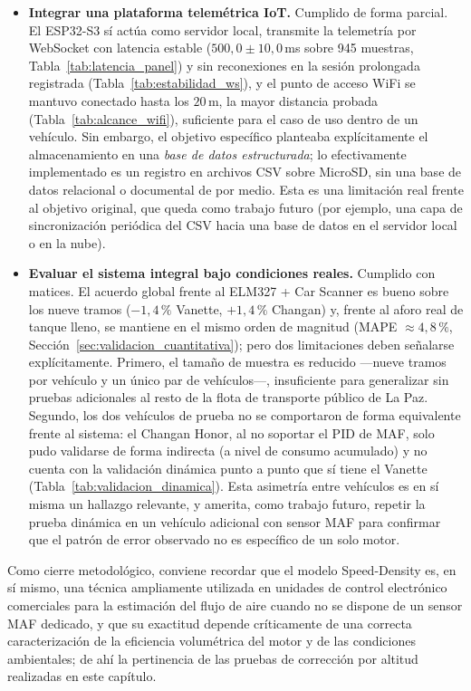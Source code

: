 \begin{itemize}
	\item \textbf{Integrar una plataforma telemétrica IoT.} Cumplido de forma parcial. El ESP32-S3 sí actúa como servidor local, transmite la telemetría por WebSocket con latencia estable ($500{,}0 \pm 10{,}0$\,ms sobre 945 muestras, Tabla~\ref{tab:latencia_panel}) y sin reconexiones en la sesión prolongada registrada (Tabla~\ref{tab:estabilidad_ws}), y el punto de acceso WiFi se mantuvo conectado hasta los $20$\,m, la mayor distancia probada (Tabla~\ref{tab:alcance_wifi}), suficiente para el caso de uso dentro de un vehículo. Sin embargo, el objetivo específico planteaba explícitamente el almacenamiento en una \emph{base de datos estructurada}; lo efectivamente implementado es un registro en archivos CSV sobre MicroSD, sin una base de datos relacional o documental de por medio. Esta es una limitación real frente al objetivo original, que queda como trabajo futuro (por ejemplo, una capa de sincronización periódica del CSV hacia una base de datos en el servidor local o en la nube).

	\item \textbf{Evaluar el sistema integral bajo condiciones reales.} Cumplido con matices. El acuerdo global frente al ELM327 + Car Scanner es bueno sobre los nueve tramos ($-1{,}4\,\%$ Vanette, $+1{,}4\,\%$ Changan) y, frente al aforo real de tanque lleno, se mantiene en el mismo orden de magnitud (MAPE $\approx 4{,}8\,\%$, Sección~\ref{sec:validacion_cuantitativa}); pero dos limitaciones deben señalarse explícitamente. Primero, el tamaño de muestra es reducido —nueve tramos por vehículo y un único par de vehículos—, insuficiente para generalizar sin pruebas adicionales al resto de la flota de transporte público de La Paz. Segundo, los dos vehículos de prueba no se comportaron de forma equivalente frente al sistema: el Changan Honor, al no soportar el PID de MAF, solo pudo validarse de forma indirecta (a nivel de consumo acumulado) y no cuenta con la validación dinámica punto a punto que sí tiene el Vanette (Tabla~\ref{tab:validacion_dinamica}). Esta asimetría entre vehículos es en sí misma un hallazgo relevante, y amerita, como trabajo futuro, repetir la prueba dinámica en un vehículo adicional con sensor MAF para confirmar que el patrón de error observado no es específico de un solo motor.
\end{itemize}

Como cierre metodológico, conviene recordar que el modelo Speed-Density es, en sí mismo, una técnica ampliamente utilizada en unidades de control electrónico comerciales para la estimación del flujo de aire cuando no se dispone de un sensor MAF dedicado, y que su exactitud depende críticamente de una correcta caracterización de la eficiencia volumétrica del motor y de las condiciones ambientales; de ahí la pertinencia de las pruebas de corrección por altitud realizadas en este capítulo.